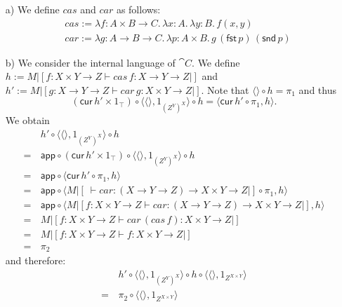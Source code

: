 \begin{answer}
    \begin{itemize}
        \item[a)] We define $cas$ and $car$ as follows:
            \begin{align*}
                & cas := \lambda f: A \times B \to C.\,\lambda x: A.\,\lambda y: B.\,f(x, y) \\
                & car := \lambda g: A \to B \to C.\,\lambda p: A \times B.\,g\,(\mathsf{fst}\,p)\,(\mathsf{snd}\,p)
            \end{align*}
        \item[b)] We consider the internal language of $\cat{C}$.
            We define $h := M|[f: X \times Y \to Z \vdash cas\,f: X \to Y \to Z|]$ and $h' := M|[g: X \to Y \to Z \vdash car\,g: X \times Y \to Z|]$.
            Note that $\langle\rangle \circ h = \pi_1$ and thus
            \[ (\mathsf{cur}\,h' \times 1_{\top}) \circ \langle \langle\rangle, 1_{(Z^Y)^X} \rangle \circ h = \langle \mathsf{cur}\,h' \circ \pi_1, h \rangle. \]
            We obtain
            \begin{align*}
                & h' \circ \langle\langle\rangle, 1_{(Z^Y)^X}\rangle \circ h \\
                = \,& \mathsf{app} \circ (\mathsf{cur}\,h' \times 1_\top) \circ \langle\langle\rangle, 1_{(Z^Y)^X}\rangle \circ h \\
                = \,& \mathsf{app} \circ \langle \mathsf{cur}\,h' \circ \pi_1, h \rangle \\
                = \,& \mathsf{app} \circ \langle M|[\ \vdash car: (X \to Y \to Z) \to X \times Y \to Z|] \circ \pi_1, h \rangle \\
                = \,& \mathsf{app} \circ \langle M|[f: X \times Y \to Z \vdash car: (X \to Y \to Z) \to X \times Y \to Z|] , h \rangle \\
                = \,& M|[f: X \times Y \to Z \vdash car\,(cas \,f): X \times Y \to Z|] \\
                = \,& M|[f: X \times Y \to Z \vdash f: X \times Y \to Z|] \\
                = \,& \pi_2
            \end{align*}
            and therefore:
            \begin{align*}
                & h' \circ \langle\langle\rangle, 1_{(Z^Y)^X}\rangle \circ h \circ \langle \langle\rangle, 1_{Z^{X \times Y}} \rangle \\
                =\, & \pi_2 \circ \langle \langle\rangle, 1_{Z^{X \times Y}} \rangle \\

\end{align*}
\end{itemize}
\end{answer}

